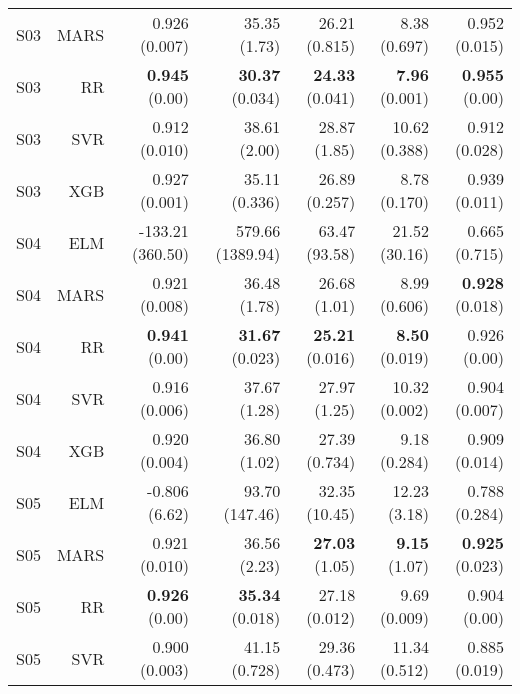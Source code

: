 \begin{table}
\begin{tabular}{rrrrrrr}
    S03 &      MARS &                       0.926 (0.007) &              35.35 (1.73) &           26.21 (0.815) &            8.38 (0.697) &         0.952 (0.015) \\
    S03 &        RR &                 { \bf 0.945} (0.00) &      { \bf 30.37} (0.034) &    { \bf 24.33} (0.041) &     { \bf 7.96} (0.001) &   { \bf 0.955} (0.00) \\
    S03 &       SVR &                       0.912 (0.010) &              38.61 (2.00) &            28.87 (1.85) &           10.62 (0.388) &         0.912 (0.028) \\
    S03 &       XGB &                       0.927 (0.001) &             35.11 (0.336) &           26.89 (0.257) &            8.78 (0.170) &         0.939 (0.011) \\
    S04 &       ELM &                    -133.21 (360.50) &          579.66 (1389.94) &           63.47 (93.58) &           21.52 (30.16) &         0.665 (0.715) \\
    S04 &      MARS &                       0.921 (0.008) &              36.48 (1.78) &            26.68 (1.01) &            8.99 (0.606) &  { \bf 0.928} (0.018) \\
    S04 &        RR &                 { \bf 0.941} (0.00) &      { \bf 31.67} (0.023) &    { \bf 25.21} (0.016) &     { \bf 8.50} (0.019) &          0.926 (0.00) \\
    S04 &       SVR &                       0.916 (0.006) &              37.67 (1.28) &            27.97 (1.25) &           10.32 (0.002) &         0.904 (0.007) \\
    S04 &       XGB &                       0.920 (0.004) &              36.80 (1.02) &           27.39 (0.734) &            9.18 (0.284) &         0.909 (0.014) \\
    S05 &       ELM &                       -0.806 (6.62) &            93.70 (147.46) &           32.35 (10.45) &            12.23 (3.18) &         0.788 (0.284) \\
    S05 &      MARS &                       0.921 (0.010) &              36.56 (2.23) &     { \bf 27.03} (1.05) &      { \bf 9.15} (1.07) &  { \bf 0.925} (0.023) \\
    S05 &        RR &                 { \bf 0.926} (0.00) &      { \bf 35.34} (0.018) &           27.18 (0.012) &            9.69 (0.009) &          0.904 (0.00) \\
    S05 &       SVR &                       0.900 (0.003) &             41.15 (0.728) &           29.36 (0.473) &           11.34 (0.512) &         0.885 (0.019) \\

\end{tabular}
\end{table}
